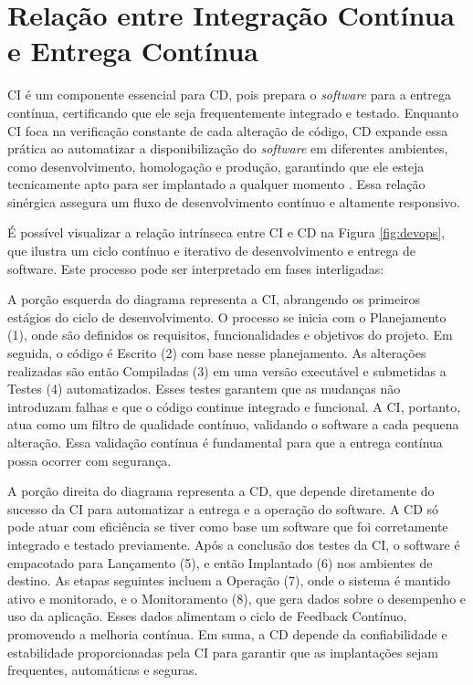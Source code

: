 \section{Relação entre Integração Contínua e Entrega Contínua}

CI é um componente essencial para CD, pois prepara o \textit{software} para a entrega contínua, certificando que ele seja frequentemente integrado e testado. Enquanto CI foca na verificação constante de cada alteração de código, CD expande essa prática ao automatizar a disponibilização do \textit{software} em diferentes ambientes, como desenvolvimento, homologação e produção, garantindo que ele esteja tecnicamente apto para ser implantado a qualquer momento \cite{RedHat2025}. Essa relação sinérgica assegura um fluxo de desenvolvimento contínuo e altamente responsivo.

É possível visualizar a relação intrínseca entre CI e CD na Figura \ref{fig:devops}, que ilustra um ciclo contínuo e iterativo de desenvolvimento e entrega de software. Este processo pode ser interpretado em fases interligadas:

A porção esquerda do diagrama representa a CI, abrangendo os primeiros estágios do ciclo de desenvolvimento. O processo se inicia com o Planejamento (1), onde são definidos os requisitos, funcionalidades e objetivos do projeto. Em seguida, o código é Escrito (2) com base nesse planejamento. As alterações realizadas são então Compiladas (3) em uma versão executável e submetidas a Testes (4) automatizados. Esses testes garantem que as mudanças não introduzam falhas e que o código continue integrado e funcional. A CI, portanto, atua como um filtro de qualidade contínuo, validando o software a cada pequena alteração. Essa validação contínua é fundamental para que a entrega contínua possa ocorrer com segurança.

A porção direita do diagrama representa a CD, que depende diretamente do sucesso da CI para automatizar a entrega e a operação do software. A CD só pode atuar com eficiência se tiver como base um software que foi corretamente integrado e testado previamente. Após a conclusão dos testes da CI, o software é empacotado para Lançamento (5), e então Implantado (6) nos ambientes de destino. As etapas seguintes incluem a Operação (7), onde o sistema é mantido ativo e monitorado, e o Monitoramento (8), que gera dados sobre o desempenho e uso da aplicação. Esses dados alimentam o ciclo de Feedback Contínuo, promovendo a melhoria contínua. Em suma, a CD depende da confiabilidade e estabilidade proporcionadas pela CI para garantir que as implantações sejam frequentes, automáticas e seguras.

